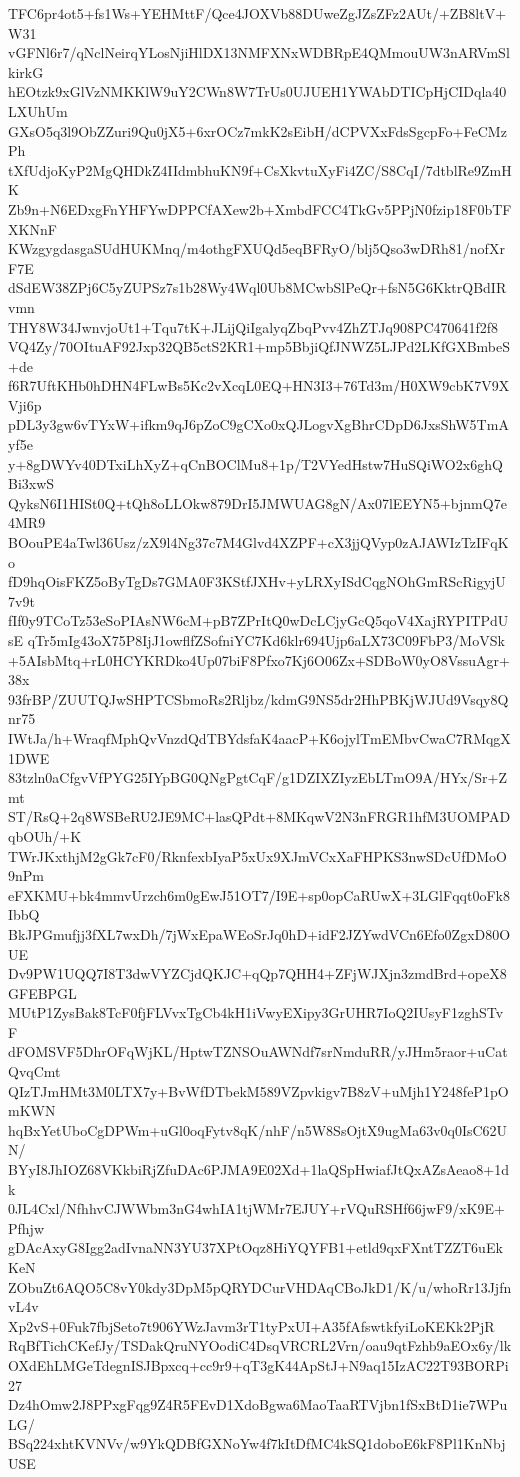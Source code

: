 TFC6pr4ot5+fs1Ws+YEHMttF/Qce4JOXVb88DUweZgJZsZFz2AUt/+ZB8ltV+W31
vGFNl6r7/qNclNeirqYLosNjiHlDX13NMFXNxWDBRpE4QMmouUW3nARVmSlkirkG
hEOtzk9xGlVzNMKKlW9uY2CWn8W7TrUs0UJUEH1YWAbDTICpHjCIDqla40LXUhUm
GXsO5q3l9ObZZuri9Qu0jX5+6xrOCz7mkK2sEibH/dCPVXxFdsSgcpFo+FeCMzPh
tXfUdjoKyP2MgQHDkZ4IIdmbhuKN9f+CsXkvtuXyFi4ZC/S8CqI/7dtblRe9ZmHK
Zb9n+N6EDxgFnYHFYwDPPCfAXew2b+XmbdFCC4TkGv5PPjN0fzip18F0bTFXKNnF
KWzgygdasgaSUdHUKMnq/m4othgFXUQd5eqBFRyO/blj5Qso3wDRh81/nofXrF7E
dSdEW38ZPj6C5yZUPSz7s1b28Wy4Wql0Ub8MCwbSlPeQr+fsN5G6KktrQBdIRvmn
THY8W34JwnvjoUt1+Tqu7tK+JLijQiIgalyqZbqPvv4ZhZTJq908PC470641f2f8
VQ4Zy/70OItuAF92Jxp32QB5ctS2KR1+mp5BbjiQfJNWZ5LJPd2LKfGXBmbeS+de
f6R7UftKHb0hDHN4FLwBs5Kc2vXcqL0EQ+HN3I3+76Td3m/H0XW9cbK7V9XVji6p
pDL3y3gw6vTYxW+ifkm9qJ6pZoC9gCXo0xQJLogvXgBhrCDpD6JxsShW5TmAyf5e
y+8gDWYv40DTxiLhXyZ+qCnBOClMu8+1p/T2VYedHstw7HuSQiWO2x6ghQBi3xwS
QyksN6I1HISt0Q+tQh8oLLOkw879DrI5JMWUAG8gN/Ax07lEEYN5+bjnmQ7e4MR9
BOouPE4aTwl36Usz/zX9l4Ng37c7M4Glvd4XZPF+cX3jjQVyp0zAJAWIzTzIFqKo
fD9hqOisFKZ5oByTgDs7GMA0F3KStfJXHv+yLRXyISdCqgNOhGmRScRigyjU7v9t
fIf0y9TCoTz53eSoPIAsNW6cM+pB7ZPrItQ0wDcLCjyGcQ5qoV4XajRYPITPdUsE
qTr5mIg43oX75P8IjJ1owflfZSofniYC7Kd6klr694Ujp6aLX73C09FbP3/MoVSk
+5AIsbMtq+rL0HCYKRDko4Up07biF8Pfxo7Kj6O06Zx+SDBoW0yO8VssuAgr+38x
93frBP/ZUUTQJwSHPTCSbmoRs2Rljbz/kdmG9NS5dr2HhPBKjWJUd9Vsqy8Qnr75
IWtJa/h+WraqfMphQvVnzdQdTBYdsfaK4aacP+K6ojylTmEMbvCwaC7RMqgX1DWE
83tzln0aCfgvVfPYG25IYpBG0QNgPgtCqF/g1DZIXZIyzEbLTmO9A/HYx/Sr+Zmt
ST/RsQ+2q8WSBeRU2JE9MC+lasQPdt+8MKqwV2N3nFRGR1hfM3UOMPADqbOUh/+K
TWrJKxthjM2gGk7cF0/RknfexbIyaP5xUx9XJmVCxXaFHPKS3nwSDcUfDMoO9nPm
eFXKMU+bk4mmvUrzch6m0gEwJ51OT7/I9E+sp0opCaRUwX+3LGlFqqt0oFk8IbbQ
BkJPGmufjj3fXL7wxDh/7jWxEpaWEoSrJq0hD+idF2JZYwdVCn6Efo0ZgxD80OUE
Dv9PW1UQQ7I8T3dwVYZCjdQKJC+qQp7QHH4+ZFjWJXjn3zmdBrd+opeX8GFEBPGL
MUtP1ZysBak8TcF0fjFLVvxTgCb4kH1iVwyEXipy3GrUHR7IoQ2IUsyF1zghSTvF
dFOMSVF5DhrOFqWjKL/HptwTZNSOuAWNdf7srNmduRR/yJHm5raor+uCatQvqCmt
QIzTJmHMt3M0LTX7y+BvWfDTbekM589VZpvkigv7B8zV+uMjh1Y248feP1pOmKWN
hqBxYetUboCgDPWm+uGl0oqFytv8qK/nhF/n5W8SsOjtX9ugMa63v0q0IsC62UN/
BYyI8JhIOZ68VKkbiRjZfuDAc6PJMA9E02Xd+1laQSpHwiafJtQxAZsAeao8+1dk
0JL4Cxl/NfhhvCJWWbm3nG4whIA1tjWMr7EJUY+rVQuRSHf66jwF9/xK9E+Pfhjw
gDAcAxyG8Igg2adIvnaNN3YU37XPtOqz8HiYQYFB1+etld9qxFXntTZZT6uEkKeN
ZObuZt6AQO5C8vY0kdy3DpM5pQRYDCurVHDAqCBoJkD1/K/u/whoRr13JjfnvL4v
Xp2vS+0Fuk7fbjSeto7t906YWzJavm3rT1tyPxUI+A35fAfswtkfyiLoKEKk2PjR
RqBfTichCKefJy/TSDakQruNYOodiC4DsqVRCRL2Vrn/oau9qtFzhb9aEOx6y/lk
OXdEhLMGeTdegnISJBpxcq+cc9r9+qT3gK44ApStJ+N9aq15IzAC22T93BORPi27
Dz4hOmw2J8PPxgFqg9Z4R5FEvD1XdoBgwa6MaoTaaRTVjbn1fSxBtD1ie7WPuLG/
BSq224xhtKVNVv/w9YkQDBfGXNoYw4f7kItDfMC4kSQ1doboE6kF8Pl1KnNbjUSE
